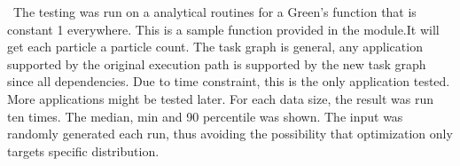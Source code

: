 \documentclass[final,t]{beamer}
\begin{document}
\begin{frame}[fragile]{}
\begin{columns}[t]
\begin{column}{.45\linewidth}
      \begin{tcolorbox}[toplevelbox,adjusted title=Results]
        \  The testing was run on a analytical routines for a Green's function that is
        constant 1 everywhere. This is a sample function provided in the module.It will
        get each particle a particle count. The task graph is general, any application supported by the original execution path is supported by the new task graph since all dependencies. Due to time constraint, this is the only application tested. More applications might be tested later. For each data size, the result was run ten times. The median, min and 90 percentile was shown. The input was randomly generated each run, thus avoiding the possibility that optimization only targets specific
        distribution.
      \end{tcolorbox}

      \begin{tcolorbox}[toplevelbox,adjusted title=References]
        \lipsum[8]
      \end{tcolorbox}

    \end{column}


  \end{columns}
\end{frame}
\end{document}
